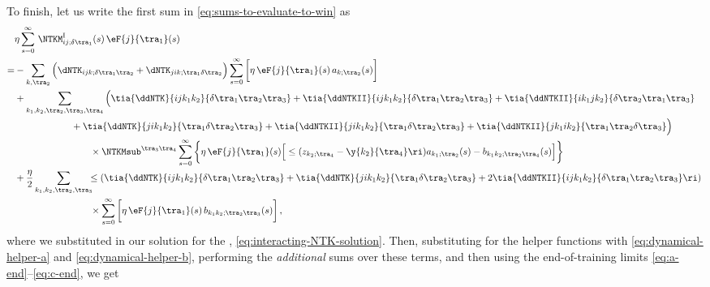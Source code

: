 To finish,  let us write the first sum in \eqref{eq:sums-to-evaluate-to-win} as
\begin{align}\label{eq:interacting-NTK-solution-sum-pre}
&\eta\sum_{s=0}^{\infty}\, \NTKM^{\text{I}}_{ij;\delta\tra_1}(s)\,\eF{j}{\tra_1}(s)\, \\
=&-\sum_{k,\tra_2}\Big(\dNTK_{ijk;\delta\tra_1\tra_2}+\dNTK_{ji k;\tra_1\delta\tra_2}\Big)\sum_{s=0}^{\infty}\bigg[\eta\, \eF{j}{\tra_1}(s)\, a_{k;\tra_2}(s)\bigg] \notag \, \\
&+ \sum_{k_1,k_2,\tra_2,\tra_3,\tra_4}\Big(
\tia{\ddNTK}{ij k_1 k_2}{\delta\tra_1\tra_2\tra_3}+
\tia{\ddNTKII}{ij  k_1 k_2}{\delta\tra_1\tra_2\tra_3}+
\tia{\ddNTKII}{i k_1 j  k_2}{\delta\tra_2\tra_1\tra_3}
\, \notag \\
&\qquad\qquad\quad\ \ \ +
\tia{\ddNTK}{ji  k_1 k_2}{\tra_1\delta\tra_2\tra_3}+ 
\tia{\ddNTKII}{ji  k_1 k_2}{\tra_1\delta\tra_2\tra_3}+
\tia{\ddNTKII}{j k_1 i  k_2}{\tra_1\tra_2\delta\tra_3}
\Big)\, \notag \\
&\qquad\qquad\qquad\qquad\times\NTKMsub^{\tra_3\tra_4} \sum_{s=0}^{\infty}\bigg\{ \eta\, \eF{j}{\tra_1}(s)\Big[ 
\le( z_{k_2;\tra_4}-\y{k_2}{\tra_4} \ri) a_{k_1;\tra_2}(s) 
-
 b_{k_1k_2;\tra_2\tra_4}(s)
\Big]\bigg\}
\, \notag \\
&+\frac{\eta}{2}\sum_{k_1,k_2,\tra_2,\tra_3}\!\!\!\le(\tia{\ddNTK}{ij k_1k_2}{\delta\tra_1\tra_2\tra_3}+\tia{\ddNTK}{ji k_1k_2}{\tra_1\delta\tra_2\tra_3} + 2\tia{\ddNTKII}{ij k_1k_2}{\delta\tra_1\tra_2\tra_3} \ri) \, \notag\\
&\qquad\qquad\qquad\qquad\times \sum_{s=0}^{\infty} \bigg[ \eta\, \eF{j}{\tra_1}(s)\, b_{k_1k_2;\tra_2\tra_3}(s) \bigg] \, ,\notag 
\end{align}
where we substituted in our solution for the , \eqref{eq:interacting-NTK-solution}. Then, substituting for the helper functions with \eqref{eq:dynamical-helper-a} and \eqref{eq:dynamical-helper-b}, performing the \emph{additional} sums over these terms, and then using the end-of-training limits
 \eqref{eq:a-end}--\eqref{eq:c-end}, we get
